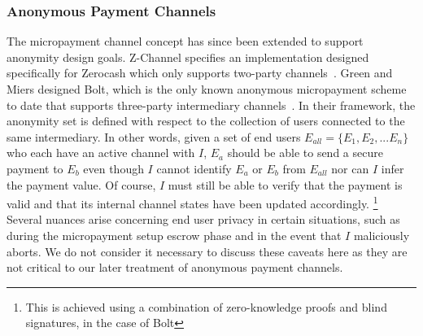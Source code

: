 \subsubsection{Anonymous Payment Channels} The micropayment channel concept has since
been extended to support anonymity design goals. Z-Channel specifies an
implementation designed specifically for Zerocash which only supports two-party
channels~\cite{zhang2017z}. Green and Miers designed Bolt, which is the only
known anonymous micropayment scheme to date that supports three-party
intermediary channels~\cite{green2017bolt}. In their framework, the anonymity
set is defined with respect to the collection of users connected to the same
intermediary. In other words, given a set of end users
$E_{all} = \{E_1, E_2, ... E_n\}$ who each have an active channel with $I$,
$E_a$ should be able to send a secure payment to $E_b$ even though $I$ cannot
identify $E_a$ or $E_b$ from $E_{all}$ nor can $I$ infer the payment value. Of
course, $I$ must still be able to verify that the payment is valid and that its
internal channel states have been updated accordingly.
\footnote{This is achieved
  using a combination of zero-knowledge proofs and blind signatures, in the case
  of Bolt}
Several nuances arise concerning end user privacy in certain
situations, such as during the micropayment setup escrow phase and in the event
that $I$ maliciously aborts. We do not consider it necessary to discuss these
caveats here as they are not critical to our later treatment of anonymous
payment channels.

